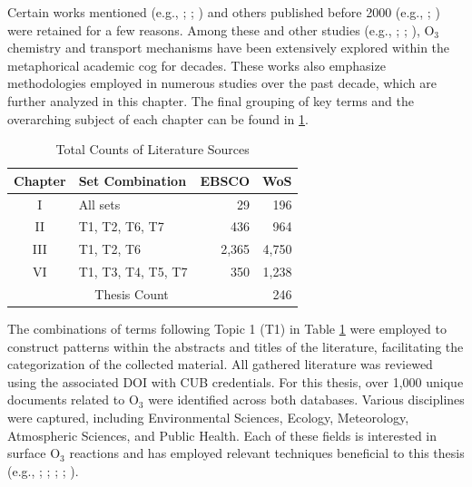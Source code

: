 Certain works mentioned (e.g., \cite{dobson_measurements_1923}; \cite{farman_large_1985}; \cite{he_sensitivity_1999}) and others published before 2000 (e.g., \cite{davies_episodes_1994}; \cite{goodchild_geographical_1992}) were retained for a few reasons. Among these and other studies (e.g., \cite{farkas_surface_1979}; \cite{padro_dry_1994}; \cite{massman_review_1998}), O$_3$ chemistry and transport mechanisms have been extensively explored within the metaphorical academic cog for decades. These works also emphasize methodologies employed in numerous studies over the past decade, which are further analyzed in this chapter. The final grouping of key terms and the overarching subject of each chapter can be found in \ref{tab:thesislitcount}. \begin{table}[h!]
    \centering
    \begin{tabular}{|c|l|r|r|}
        \hline
        \textbf{Chapter} & \textbf{Set Combination} & \textbf{EBSCO} & \textbf{WoS} \\ \hline
        I   & All sets            & 29     & 196     \\ \hline
        II  & T1, T2, T6, T7      & 436    & 964     \\ \hline
        III & T1, T2, T6          & 2,365  & 4,750   \\ \hline
        VI  & T1, T3, T4, T5, T7  & 350    & 1,238   \\ \hline
        \multicolumn{3}{|c|}{Thesis Count} & 246     \\ \hline
    \end{tabular}
    \caption{Total Counts of Literature Sources}
    \label{tab:thesislitcount}
\end{table} The combinations of terms following Topic 1 (T1) in Table \ref{tab:thesislitcount} were employed to construct patterns within the abstracts and titles of the literature, facilitating the categorization of the collected material. All gathered literature was reviewed using the associated DOI with CUB credentials. For this thesis, over 1,000 unique documents related to O$_3$ were identified across both databases. Various disciplines were captured, including Environmental Sciences, Ecology, Meteorology, Atmospheric Sciences, and Public Health. Each of these fields is interested in surface O$_3$ reactions and has employed relevant techniques beneficial to this thesis (e.g., \cite{abdullah_development_2019}; \cite{ghozikali_effect_2015}; \cite{he_effects_2024}; \cite{turner_long-term_2016}; \cite{xiao_lu_exploring_2019}). 


